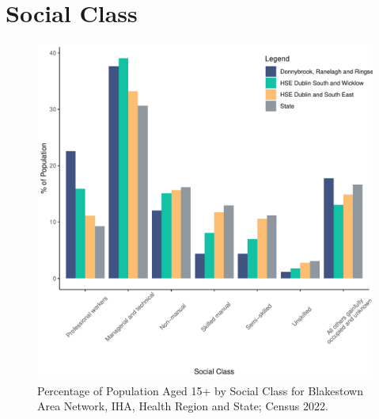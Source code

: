 \documentclass{article}
\begin{document}
\section{Social Class}\label{sect:SC}
\begin{figure}[H]
	\centering
	\includegraphics[width = 140mm]{../figures/SocialClassED.pdf}
	\caption{Percentage of Population Aged 15+ by Social Class for Blakestown Area Network, IHA, Health Region and State; Census 2022.}
	\label{fig:vbnv}
	\end{figure}
\end{document}
